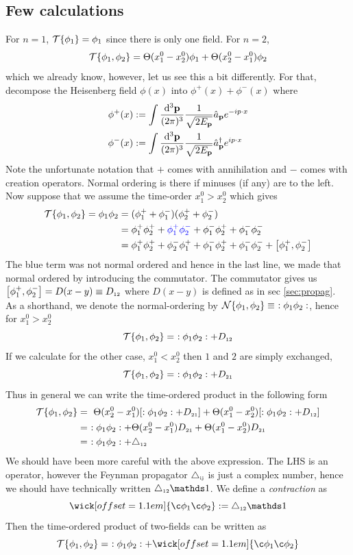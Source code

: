 \subsection{Few calculations}
For $n=1$, $\mathcal T\{\phi_1\} = \phi_1$ since there is only one field. For $n=2$, $$\mathcal T\{\phi_1, \phi_2\} = \Theta(x_1^0 - x_2^0) \phi_1 +\Theta(x_2^0 - x_1^0)\phi_2$$ which we already know, however, let us see this a bit differently. For that, decompose the Heisenberg field $\phi(x)$ into $\phi^+(x) + \phi^-(x)$ where   
\begin{align*}
    \phi^+(x) &:= \int \frac{\dd^3\vb{{\vb{p}}}}{(2\pi)^3} \frac{1}{\sqrt{2E_{\vb{p}}}}\hat{a}_{\vb{p}} e^{-i p\cdot x} \\
 \phi^-(x) &:= \int \frac{\dd^3\vb{{\vb{p}}}}{(2\pi)^3} \frac{1}{\sqrt{2E_{\vb{p}}}}\hat{a}_{\vb{p}}^\dagger e^{i p\cdot x} 
\end{align*}
Note the unfortunate notation that $+$ comes with annihilation and $-$ comes with creation operators. Normal ordering is there if minuses (if any) are to the left. Now suppose that we assume the time-order $x_1^0>x_2^0$ which gives 
\begin{align*}
    \ST\{\phi_1, \phi_2\} = \phi_1 \phi_2 &= (\php{1}+ \phm{1})(\php{2}+ \phm{2})\\
    &=\php{1}\php{2}+ \mathcolor{blue}{\php{1}\phm{2}}+ \phm{1}\php{2}+\phm{1}\phm{2}\\
    &=\php{1}\php{2}+\phm{2}{\php{1}}+ \phm{1}\php{2}+\phm{1}\phm{2} + \comtr{\php{1}}{\phm{2}}
\end{align*}
The blue term was not normal ordered and hence in the last line, we made that normal ordered by introducing the commutator. The commutator gives us $ \left[ \phi_{1}^+, \phi_{2}^- \right] = D(x-y)\equiv D_{\text{\tiny 12}}$ where $D(x-y)$ is defined as in sec \ref{sec:propag}. \\[0.2cm]
As a shorthand, we denote the normal-ordering by $\mathcal N\{\phi_1, \phi_2\} \equiv\  :\phi_1\phi_2:$, hence for $x_1^0>x_2^0$ 
$$\mathcal T\{\phi_1, \phi_2\} =\ :\phi_1\phi_2: + D_{\text{\tiny 12}}$$
If we calculate for the other case, $x_1^0<x_2^0$ then $1$ and $2$ are simply exchanged,
$$\mathcal T\{\phi_1, \phi_2\} = \ :\phi_1\phi_2: + D_{\text{\tiny 21}}$$
Thus in general we can write the time-ordered product in the following form 
\begin{align*}
    \ST\{\phi_1, \phi_2\} &= \ \Theta(x_2^0-x_1^0)[:\pho\phii: + D\tund{21}]+\Theta(x_1^0-x_2^0)[:\pho\phii: + D\tund{12}]\\ &=\ :\pho\phii:+ \Theta(x_2^0-x_1^0)D\tund{21} + \Theta(x_1^0-x_2^0) D\tund{21}\\ &= \ :\pho\phii: + \fp\tund{12}
\end{align*}
We should have been more careful with the above expression. The LHS is an operator, however the Feynman propagator $\triangle_{\text{\tiny ij}}$ is just a complex number, hence we should have technically written $\fp\tund{12} \iden$. We define a \textit{contraction } as 
$$\wick[offset=1.1em]{\c\pho \c\phii} :=\fp\tund{12} \iden$$
Then the time-ordered product of two-fields can be written as 
$${ \ST\{\phi_1, \phi_2\} = \ :\pho\phii: + \wick[offset=1.1em]{\c\pho \c\phii}}$$
